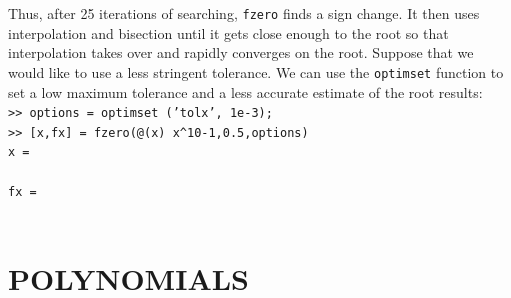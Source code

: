 \documentclass[../main.tex]{subfiles}
\begin{document}
\begin{example}
    Thus, after 25 iterations of searching, \texttt{fzero} finds a sign change. It then uses interpolation
    and bisection until it gets close enough to the root so that interpolation takes over and
    rapidly converges on the root.
    Suppose that we would like to use a less stringent tolerance. We can use the \texttt{optimset}
    function to set a low maximum tolerance and a less accurate estimate of the root results:\\

    \texttt{>> options = optimset ('tolx', 1e-3);\\
    \indent >> [x,fx] = fzero(@(x) x\textasciicircum10-1,0.5,options)\\
    \indent x =\\
    \indent{}\\
    \indent fx =\\
    \indent{}\\}
\end{example}
\bigskip

\section[POLYNOMIALS]{POLYNOMIALS}
\end{document}
